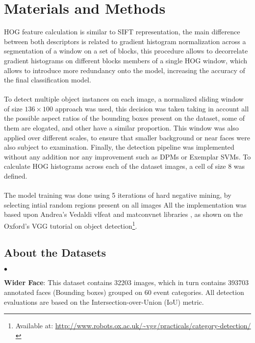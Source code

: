 \documentclass[10pt,twocolumn,letterpaper]{article}
\newcommand{\squishlist}{
 \begin{list}{$\bullet$}
  { \setlength{\itemsep}{0pt}
     \setlength{\parsep}{3pt}
     \setlength{\topsep}{3pt}
     \setlength{\partopsep}{0pt}
     \setlength{\leftmargin}{1.5em}
     \setlength{\labelwidth}{1em}
     \setlength{\labelsep}{0.5em} } }
\newcommand{\squishend}{
  \end{list}  }
\begin{document}
\section{Materials and Methods}
HOG feature calculation is similar to SIFT \cite{Lowe:1999:ORL:850924.851523} representation, the main difference between both descriptors is related to gradient histogram normalization across a segmentation of a window on a set of blocks, this procedure allows to decorrelate gradient histograms on different blocks members of a single HOG window, which allows to introduce more redundancy onto the model, increasing the accuracy of the final classification model.
\\
\\
To detect multiple object instances on each image, a normalized sliding window of size $136 \times 100$ approach was used, this decision was taken taking in account all the possible aspect ratios of the bounding boxes present on the dataset, some of them are elogated, and other have a similar proportion. This window was also applied over different scales, to ensure that smaller background or near faces were also subject to examination. Finally, the detection pipeline was implemented without any addition nor any improvement such as DPMs or Exemplar SVMs. To calculate HOG histograms across each of the dataset images, a cell of size 8 was defined.
\\
\\
The model training was done using 5 iterations of hard negative mining, by selecting intial random regions present on all images
All the implementation was based upon Andrea's Vedaldi vlfeat and matconvnet libraries \cite{vedaldi08vlfeat}, as shown on the Oxford's VGG tutorial on object detection\footnote{Available at: \url{http://www.robots.ox.ac.uk/~vgg/practicals/category-detection/}}.  

\subsection*{About the Datasets}
\squishlist
\item \textbf{Wider Face}: This dataset contains 32203 images, which in turn contains 393703 annotated faces (Bounding boxes) grouped on 60 event categories. All detection evaluations are based on the Intersection-over-Union (IoU) metric.
\squishend
\end{document}
